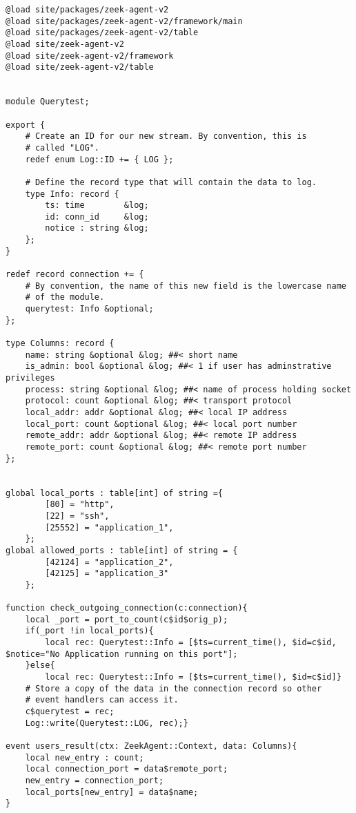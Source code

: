\begin{lstlisting}[caption={Abfrage und Abgleich der Ports },consecutivenumbers=false,lastline=77,firstnumber=52,numberblanklines=false,linerange={52-55,62-70,76-77}]
@load site/packages/zeek-agent-v2
@load site/packages/zeek-agent-v2/framework/main
@load site/packages/zeek-agent-v2/table
@load site/zeek-agent-v2
@load site/zeek-agent-v2/framework
@load site/zeek-agent-v2/table


module Querytest;

export {
    # Create an ID for our new stream. By convention, this is
    # called "LOG".
    redef enum Log::ID += { LOG };

    # Define the record type that will contain the data to log.
    type Info: record {
        ts: time        &log;
        id: conn_id     &log; 
        notice : string &log;
    };
}

redef record connection += {
    # By convention, the name of this new field is the lowercase name
    # of the module.
    querytest: Info &optional;
};

type Columns: record {
    name: string &optional &log; ##< short name
    is_admin: bool &optional &log; ##< 1 if user has adminstrative privileges
    process: string &optional &log; ##< name of process holding socket
    protocol: count &optional &log; ##< transport protocol
    local_addr: addr &optional &log; ##< local IP address
    local_port: count &optional &log; ##< local port number
    remote_addr: addr &optional &log; ##< remote IP address
    remote_port: count &optional &log; ##< remote port number
};


global local_ports : table[int] of string ={
        [80] = "http",
        [22] = "ssh",
        [25552] = "application_1",
    };
global allowed_ports : table[int] of string = {
        [42124] = "application_2",
        [42125] = "application_3" 
    };

function check_outgoing_connection(c:connection){
    local _port = port_to_count(c$id$orig_p);
    if(_port !in local_ports){
        local rec: Querytest::Info = [$ts=current_time(), $id=c$id, $notice="No Application running on this port"];
    }else{
    	local rec: Querytest::Info = [$ts=current_time(), $id=c$id]}
    # Store a copy of the data in the connection record so other
    # event handlers can access it.
    c$querytest = rec;
    Log::write(Querytest::LOG, rec);}

event users_result(ctx: ZeekAgent::Context, data: Columns){
    local new_entry : count;
    local connection_port = data$remote_port;
    new_entry = connection_port;
    local_ports[new_entry] = data$name;
}



\end{lstlisting}

